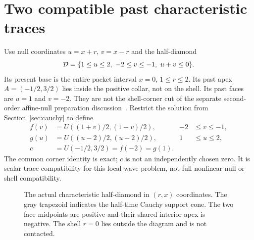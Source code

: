 \documentclass[11pt]{article}
\begin{document}
\section{Two compatible past characteristic traces}
\label{sec:diamond}
Use null coordinates $u=x+r$, $v=x-r$ and the half-diamond
\begin{equation}
 {\cal D}=\{1\le u\le2,\ -2\le v\le-1,\ u+v\le0\}.
 \label{eq:diamond}
\end{equation}
Its present base is the entire packet interval $x=0$, $1\le r\le2$.
Its past apex $A=(-1/2,3/2)$ lies inside the positive collar, not on
the shell. Its past faces are $u=1$ and $v=-2$.
They are not the shell-corner cut of the separate second-order
affine-null preparation discussion~\cite{records}.
Restrict the solution from Section~\ref{sec:cauchy} to define
\begin{equation}
\begin{aligned}
 f(v)&=U((1+v)/2,(1-v)/2),&-2&\le v\le-1,\\
 g(u)&=U((u-2)/2,(u+2)/2),&1&\le u\le2,\\
 c&=U(-1/2,3/2)=f(-2)=g(1).
\end{aligned}
\label{eq:traces}
\end{equation}
The common corner identity is exact; $c$ is not an independently
chosen zero. It is scalar trace compatibility for this local wave
problem, not full nonlinear null or shell compatibility.

\begin{figure}[htbp]
\centering
{}
\caption{The actual characteristic half-diamond in $(r,x)$ coordinates.
The gray trapezoid indicates the half-time Cauchy support cone.
The two face midpoints are positive and their shared interior apex is
negative. The shell $r=0$ lies outside the diagram and is not contacted.}
\label{fig:diamond}
\end{figure}
\end{document}

